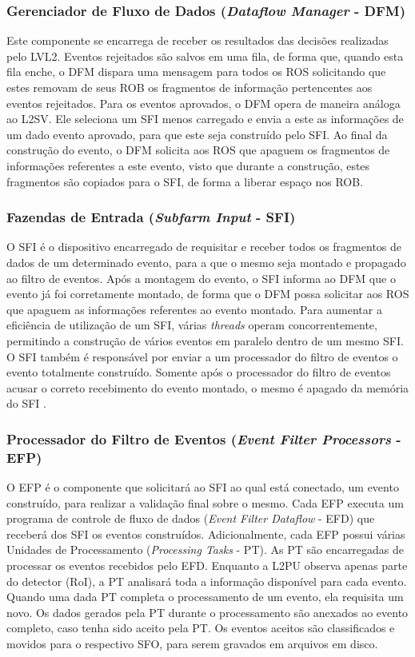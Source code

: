 \subsubsection{Gerenciador de Fluxo de Dados (\emph{Dataflow Manager} - DFM)}

Este componente se encarrega de receber os resultados das decisões realizadas pelo LVL2. Eventos rejeitados são salvos em uma fila, de forma que, quando esta fila enche, o DFM dispara uma mensagem para todos os ROS solicitando que estes removam de seus ROB os fragmentos de informação pertencentes aos eventos rejeitados. Para os eventos aprovados, o DFM opera de maneira análoga ao L2SV. Ele seleciona um SFI menos carregado e envia a este as informações de um dado evento aprovado, para que este seja construído pelo SFI. Ao final da construção do evento, o DFM solicita aos ROS que apaguem os fragmentos de informações referentes a este evento, visto que durante a construção, estes fragmentos são copiados para o SFI, de forma a liberar espaço nos ROB. 


\subsubsection{Fazendas de Entrada (\emph{Subfarm Input} - SFI)}

O SFI é o dispositivo encarregado de requisitar e receber todos os fragmentos de dados de um determinado evento, para a que o mesmo seja montado e propagado ao filtro de eventos. Após a montagem do evento, o SFI informa ao DFM que o evento já foi corretamente montado, de forma que o DFM possa solicitar aos ROS que apaguem as informações referentes ao evento montado. Para aumentar a eficiência de utilização de um SFI, várias \emph{threads} operam concorrentemente, permitindo a construção de vários eventos em paralelo dentro de um mesmo SFI. O SFI também é responsável por enviar a um processador do filtro de eventos o evento totalmente construído. Somente após o processador do filtro de eventos acusar o correto recebimento do evento montado, o mesmo é apagado da memória do SFI \cite{bib:eb}.


\subsubsection{Processador do Filtro de Eventos (\emph{Event Filter Processors} - EFP)}

O EFP é o componente que solicitará ao SFI ao qual está conectado, um evento construído, para realizar a validação final sobre o mesmo. Cada EFP executa um programa de controle de fluxo de dados (\emph{Event Filter Dataflow} - EFD) que receberá dos SFI os eventos construídos. Adicionalmente, cada EFP possui várias Unidades de Processamento (\emph{Processing Tasks} - PT). As PT são encarregadas de processar os eventos recebidos pelo EFD. Enquanto a L2PU observa apenas parte do detector (RoI), a PT analisará toda a informação disponível para cada evento.  Quando uma dada PT completa o processamento de um evento, ela requisita um novo. Os dados gerados pela PT durante o processamento são anexados ao evento completo, caso tenha sido aceito pela PT. Os eventos aceitos são classificados e movidos para o respectivo SFO, para serem gravados em arquivos em disco.

